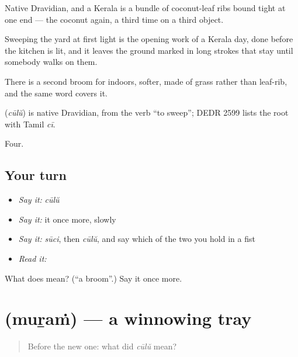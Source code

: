 Native Dravidian, and a Kerala  is a bundle of coconut-leaf ribs bound tight at one end — the coconut again, a third time on a third object.

Sweeping the yard at first light is the opening work of a Kerala day, done before the kitchen is lit, and it leaves the ground marked in long strokes that stay until somebody walks on them.

There is a second broom for indoors, softer, made of grass rather than leaf-rib, and the same word covers it.

\begin{cousinweb}
\textbf{} (\emph{cūlŭ}) is native Dravidian, from the verb \textquotedblleft{}to sweep\textquotedblright{}; DEDR 2599 lists the root with Tamil \emph{cī}.
\end{cousinweb}

\begin{grammarlens}[title={What you've built}]
Four.
\end{grammarlens}

\subsection*{Your turn}
\begin{itemize}
\raggedright
  \item \emph{Say it:} \emph{cūlŭ}
  \item \emph{Say it:} it once more, slowly
  \item \emph{Say it:} \emph{sūci}, then \emph{cūlŭ}, and say which of the two you hold in a fist
  \item \emph{Read it:} \textbf{}
\end{itemize}

\begin{tcolorbox}[breakable,colback=teal!4,colframe=teal!35!black,title={Before you move on}]
What does  mean? (\textquotedblleft{}a broom\textquotedblright{}.) Say it once more.
\end{tcolorbox}
\section[\texorpdfstring{\ml{മുറം} (muṟaṁ)}{മുറം (muṟaṁ)}]{ (muṟaṁ) — a winnowing tray}

\label{lesson:ML-C62-winnowing-tray}



\begin{quote}
Before the new one: what did \emph{cūlŭ} mean?
\end{quote}

